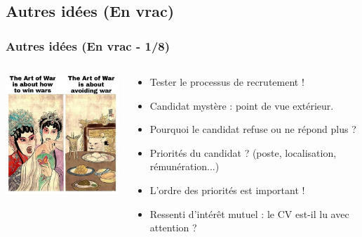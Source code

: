 \documentclass[slidetop,11pt]{beamer}
\begin{document}
\subsection{Autres id{\'e}es (En vrac)}
\begin{frame}
	\frametitle{Autres id{\'e}es (En vrac - 1/8)}
	\begin{columns}[T]
	\begin{column}[T]{5cm}
		\includegraphics[width=5cm]{img/1651166248397.jpeg}~\\
	\end{column}
	\begin{column}[T]{7cm}
		\begin{itemize}
			\item Tester le processus de recrutement !
			\item Candidat myst{\`e}re : point de vue ext{\'e}rieur. 
			\item Pourquoi le candidat refuse ou ne r{\'e}pond plus ?
			\item Priorit{\'e}s du candidat ? (poste, localisation, r{\'e}mun{\'e}ration...)
			\item L'ordre des priorit{\'e}s est important !
			\item Ressenti d'int{\'e}r{\^e}t mutuel : le CV est-il lu avec attention ? 
		\end{itemize}
	\end{column}
	\end{columns}

\end{frame}
\end{document}
